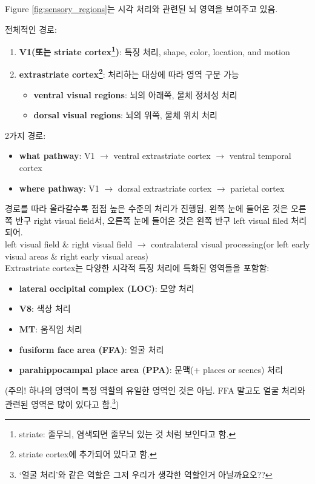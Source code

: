 \documentclass[../note.tex]{subfiles}
\begin{document}
Figure \ref{fig:sensory_regions}는 시각 처리와 관련된 뇌 영역을 보여주고 있음.

전체적인 경로:
\begin{enumerate}
  \item \textbf{V1(또는 striate cortex\footnote{striate: 줄무늬, 염색되면 줄무늬 있는 것 처럼 보인다고 함.})}: 특징 처리, shape, color, location, and motion
  \item \textbf{extrastriate cortex\footnote{striate cortex에 추가되어 있다고 함.}}: 처리하는 대상에 따라 영역 구분 가능\\
    \begin{itemize}
      \item \textbf{ventral visual regions}: 뇌의 아래쪽, 물체 정체성 처리
      \item \textbf{dorsal visual regions}: 뇌의 위쪽, 물체 위치 처리
    \end{itemize}
\end{enumerate}

2가지 경로:
\begin{itemize}
  \item \textbf{what pathway}:
    V1 $\longrightarrow$ ventral extrastriate cortex $\longrightarrow$ ventral temporal cortex
  \item \textbf{where pathway}:
    V1 $\longrightarrow$ dorsal extrastriate cortex $\longrightarrow$ parietal cortex
\end{itemize}
경로를 따라 올라갈수록 점점 높은 수준의 처리가 진행됨. 왼쪽 눈에 들어온 것은 오른쪽 반구 right visual field서, 오른쪽 눈에 들어온 것은 왼쪽 반구 left visual filed 처리되어.\\

left visual field \& right visual field $\longrightarrow$ contralateral visual processing(or left early visual areas \& right early visual areas)\\

Extrastriate cortex는 다양한 시각적 특징 처리에 특화된 영역들을 포함함:
\begin{itemize}
  \item \textbf{lateral occipital complex (LOC)}: 모양 처리
  \item \textbf{V8}: 색상 처리
  \item \textbf{MT}: 움직임 처리
  \item \textbf{fusiform face area (FFA)}: 얼굴 처리
  \item \textbf{parahippocampal place area (PPA)}: 문맥(+ places or scenes) 처리
\end{itemize}
(주의! 하나의 영역이 특정 역할의 유일한 영역인 것은 아님. FFA 말고도 얼굴 처리와 관련된 영역은 많이 있다고 함.\footnote{`얼굴 처리'와 같은 역할은 그저 우리가 생각한 역할인거 아닐까요오??})\\
\end{document}
